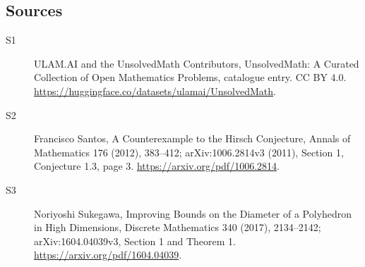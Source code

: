 \documentclass[11pt]{article}
\begin{document}
\subsection{Sources}
\begin{description}
\item[\hypertarget{source:statement:1}{S1}] ULAM.AI and the UnsolvedMath Contributors, UnsolvedMath: A Curated Collection of Open Mathematics Problems, catalogue entry. CC BY 4.0. \url{https://huggingface.co/datasets/ulamai/UnsolvedMath}.
\item[\hypertarget{source:statement:2}{S2}] Francisco Santos, A Counterexample to the Hirsch Conjecture, Annals of Mathematics 176 (2012), 383--412; arXiv:1006.2814v3 (2011), Section 1, Conjecture 1.3, page 3. \url{https://arxiv.org/pdf/1006.2814}.
\item[\hypertarget{source:statement:3}{S3}] Noriyoshi Sukegawa, Improving Bounds on the Diameter of a Polyhedron in High Dimensions, Discrete Mathematics 340 (2017), 2134--2142; arXiv:1604.04039v3, Section 1 and Theorem 1. \url{https://arxiv.org/pdf/1604.04039}.
\end{description}
\label{end:statement}
\end{document}
